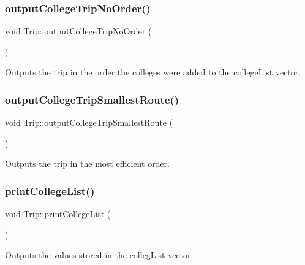 \subsubsection{\texorpdfstring{output\+College\+Trip\+No\+Order()}{outputCollegeTripNoOrder()}}
{\footnotesize\ttfamily void Trip\+::output\+College\+Trip\+No\+Order (\begin{DoxyParamCaption}{ }\end{DoxyParamCaption})}



Outputs the trip in the order the colleges were added to the college\+List vector. 

\mbox{\label{class_trip_a44cf30382f49a42f2f45615b14330ea8}} 
\subsubsection{\texorpdfstring{output\+College\+Trip\+Smallest\+Route()}{outputCollegeTripSmallestRoute()}}
{\footnotesize\ttfamily void Trip\+::output\+College\+Trip\+Smallest\+Route (\begin{DoxyParamCaption}{ }\end{DoxyParamCaption})}



Outputs the trip in the most efficient order. 

\mbox{\label{class_trip_a96259feb01ba260ca35d52e7bd59c25e}} 
\subsubsection{\texorpdfstring{print\+College\+List()}{printCollegeList()}}
{\footnotesize\ttfamily void Trip\+::print\+College\+List (\begin{DoxyParamCaption}{ }\end{DoxyParamCaption})}



Outputs the values stored in the colleg\+List vector. 

\mbox{\label{class_trip_a65fa30762ec89db37069a7180b22f939}} 
